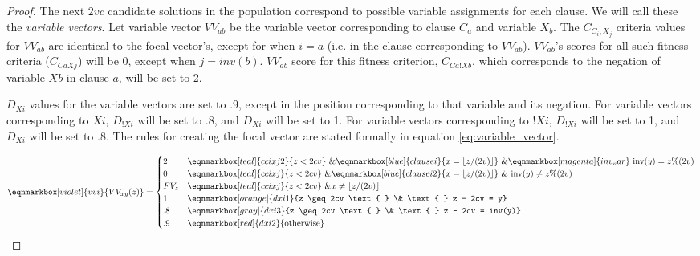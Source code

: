 \documentclass[sigconf]{acmart}
\begin{document}
\begin{proof}
\vspace{1.5em}

The next $2vc$ candidate solutions in the population correspond to possible variable assignments for each clause. We will call these the \textit{variable vectors}. Let variable vector $VV_{ab}$ be the variable vector corresponding to clause $C_a$ and variable $X_b$. The $C_{C_{i},X_{j}}$ criteria values for $VV_{ab}$ are identical to the focal vector's, except for when $i=a$ (i.e. in the clause corresponding to $VV_{ab}$). $VV_{ab}$'s scores for all such fitness criteria ($C_{CaXj}$) will be 0, except when $j=inv(b)$. $VV_{ab}$ score for this fitness criterion, $C_{Ca!Xb}$, which corresponds to the negation of variable $Xb$ in clause $a$, will be set to 2. 

$D_{Xi}$ values for the variable vectors are set to .9, except in the position corresponding to that variable and its negation. For variable vectors corresponding to $Xi$, $D_{!Xi}$ will be set to .8, and $D_{Xi}$ will be set to 1. For variable vectors corresponding to $!Xi$, $D_{!Xi}$ will be set to 1, and $D_{Xi}$ will be set to .8. The rules for creating the focal vector are stated formally in equation \ref{eq:variable_vector}.

\vspace{3em}

\begin{equation}
\label{eq:variable_vector}
\eqnmarkbox[violet]{vvi}{VV_{xy}(z)} = \begin{cases} 
2 & \eqnmarkbox[teal]{ccixj2}{z < 2cv} \text{ } \& \eqnmarkbox[blue]{clausei}{x = {\lfloor z/(2v)\rfloor}}  \text{ } \& \eqnmarkbox[magenta]{inv_var}{\text{ inv}(y) = z\%(2v)}\\
0 & \eqnmarkbox[teal]{ccixj}{z < 2cv} \text{ } \& \eqnmarkbox[blue]{clausei2}{x = {\lfloor z/(2v)\rfloor}}  \text{ } \& \text{ inv}(y) \neq z\%(2v)\\
FV_z & \eqnmarkbox[teal]{ccixj}{z < 2cv} \text{ } \& x \neq {\lfloor z/(2v)\rfloor} \\
1 & \eqnmarkbox[orange]{dxi1}{z \geq 2cv \text{ } \& \text{ } z - 2cv = y}  \\
.8 & \eqnmarkbox[gray]{dxi3}{z \geq 2cv \text{ } \& \text{ } z - 2cv = inv(y)}  \\
.9 & \eqnmarkbox[red]{dxi2}{\text{otherwise}}
\end{cases}
\end{equation}


\end{proof}
\end{document}
